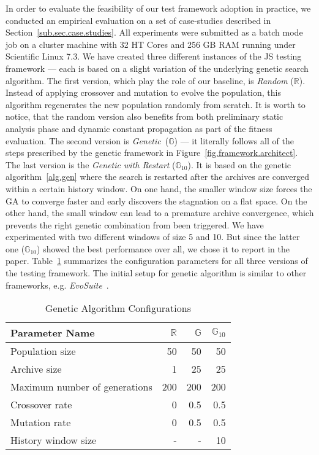 \documentclass[sigconf,review,anonymous]{acmart}
\newcommand{\Random}{\mathbb{R}}
\newcommand{\Genetic}{\mathbb{G}}
\newcommand{\RGenetic}{\mathbb{G}_{10}}
\begin{document}
In order to evaluate the feasibility of our test framework adoption in practice, we conducted an empirical evaluation on a set of case-studies described in Section~\ref{sub.sec.case.studies}. All experiments were submitted as a batch mode job on a cluster machine with 32 HT Cores and 256 GB RAM running under Scientific Linux 7.3. We have created three different instances of the JS testing framework --- each is based on a slight variation of the underlying genetic search algorithm. The first version, which play the role of our baseline, is \emph{Random} ($\Random$). Instead of applying crossover and mutation to evolve the population, this algorithm regenerates the new population randomly from scratch. It is worth to notice, that the random version also benefits from both preliminary static analysis phase and dynamic constant propagation as part of the fitness evaluation. The second version is \emph{Genetic}~($\Genetic$) --- it literally follows all of the steps prescribed by the genetic framework in Figure~\ref{fig.framework.architect}. The last version is the \emph{Genetic with Restart} ($\RGenetic$). It is based on the genetic algorithm~\ref{alg.gen} where the search is restarted after the archives are converged within a certain history window. On one hand, the smaller window size forces the GA to converge faster and early discovers the stagnation on a flat space. On the other hand, the small window can lead to a premature archive convergence, which prevents the right genetic combination from been triggered. We have experimented with two different windows of size 5 and 10. But since the latter one ($\RGenetic$) showed the best performance over all, we chose it to report in the paper. Table~\ref{tbl.gen.config} summarizes the configuration parameters for all three versions of the testing framework. The initial setup for genetic algorithm is similar to other frameworks, e.g. \emph{EvoSuite}~\cite{fraser2011evosuite}. 

\begin{table}
  \caption{Genetic Algorithm Configurations}
  \label{tbl.gen.config}
    \scriptsize
  \begin{tabular}{l|r|r|r}
    \toprule
    \textbf{Parameter Name} &$\Random$&$\Genetic$ &$\RGenetic$ \\
    \hline
    Population size                   & 50  & 50  & 50  \\
    Archive size                      & 1   & 25  & 25  \\
    Maximum number of generations     & 200 & 200 & 200 \\
    Crossover rate                    & 0   & 0.5 & 0.5 \\
    Mutation rate                     & 0   & 0.5 & 0.5 \\
    History window size               & -   & -   & 10  \\
    \bottomrule
  \end{tabular}
\end{table}
\end{document}

